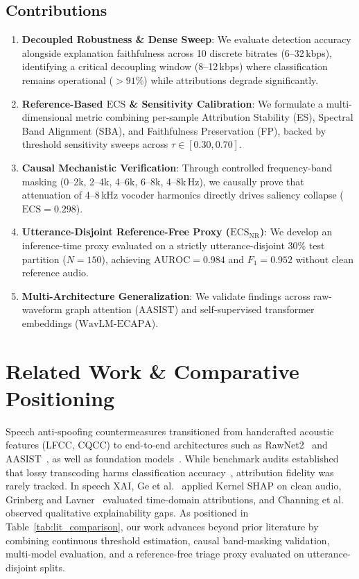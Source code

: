 \documentclass[runningheads]{llncs}
\newcommand{\ecs}{\ensuremath{\mathrm{ECS}}}
\newcommand{\ecsnr}{\ensuremath{\mathrm{ECS}_{\mathrm{NR}}}}
\newcommand{\aasist}{\ensuremath{\mathrm{AASIST}}}
\newcommand{\wavlm}{\ensuremath{\mathrm{WavLM}\text{-}\mathrm{ECAPA}}}
\begin{document}
\subsection*{Contributions}
\begin{enumerate}
  \item \textbf{Decoupled Robustness \& Dense Sweep}: We evaluate detection accuracy alongside explanation faithfulness across 10 discrete bitrates (6--32\,kbps), identifying a critical decoupling window (8--12\,kbps) where classification remains operational ($>91\%$) while attributions degrade significantly.
  \item \textbf{Reference-Based \ecs{} \& Sensitivity Calibration}: We formulate a multi-dimensional metric combining per-sample Attribution Stability (\textsc{ES}), Spectral Band Alignment (\textsc{SBA}), and Faithfulness Preservation (\textsc{FP}), backed by threshold sensitivity sweeps across $\tau \in [0.30, 0.70]$.
  \item \textbf{Causal Mechanistic Verification}: Through controlled frequency-band masking (0--2k, 2--4k, 4--6k, 6--8k, 4--8k\,Hz), we causally prove that attenuation of 4--8\,kHz vocoder harmonics directly drives saliency collapse ($\ecs = 0.298$).
  \item \textbf{Utterance-Disjoint Reference-Free Proxy (\texorpdfstring{\ecsnr{}}{ECS-NR})}: We develop an inference-time proxy evaluated on a strictly utterance-disjoint 30\% test partition ($N=150$), achieving $\text{AUROC} = 0.984$ and $F_1 = 0.952$ without clean reference audio.
  \item \textbf{Multi-Architecture Generalization}: We validate findings across raw-waveform graph attention (\aasist{}) and self-supervised transformer embeddings (\wavlm{}).
\end{enumerate}

\section{Related Work \& Comparative Positioning}
\label{sec:related}

Speech anti-spoofing countermeasures transitioned from handcrafted acoustic features (LFCC, CQCC) to end-to-end architectures such as RawNet2~\cite{tak2021rawnet2} and \aasist{}~\cite{jung2022aasist}, as well as foundation models~\cite{chen2022wavlm,baevski2020wav2vec}.
While benchmark audits established that lossy transcoding harms classification accuracy~\cite{muller2022does,valenti2024codec,li2025measuring,shi2025benchmarking}, attribution fidelity was rarely tracked.
In speech XAI, Ge et al.~\cite{ge2022explaining} applied Kernel SHAP on clean audio, Grinberg and Lavner~\cite{grinberg2025xai} evaluated time-domain attributions, and Channing et al.~\cite{channing2024toward} observed qualitative explainability gaps.
As positioned in Table~\ref{tab:lit_comparison}, our work advances beyond prior literature by combining continuous threshold estimation, causal band-masking validation, multi-model evaluation, and a reference-free triage proxy evaluated on utterance-disjoint splits.
\end{document}
